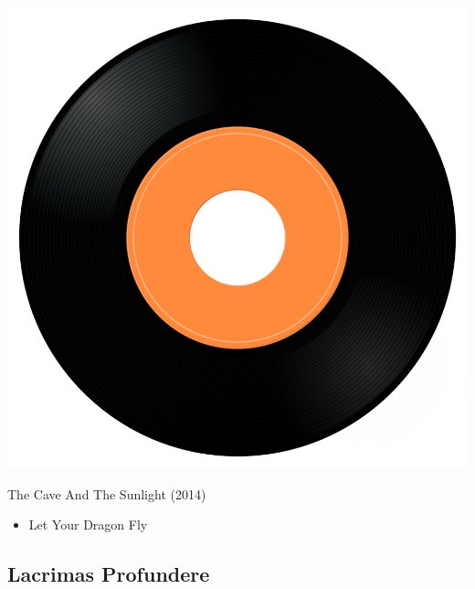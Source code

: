 \begin{minipage}[t]{0.25\textwidth}\vspace{0pt}
\captionsetup{type=figure}
\includegraphics[width=\textwidth]{Images/cover.png}
\caption*{The Cave And The Sunlight (2014)}
\end{minipage}
\begin{minipage}[t]{0.25\textwidth}\vspace{0pt}
\begin{itemize}[nosep,leftmargin=1em,labelwidth=*,align=left]
	\setlength{\itemsep}{0pt}
	\item Let Your Dragon Fly
\end{itemize}
\end{minipage}

\subsection{Lacrimas Profundere}

